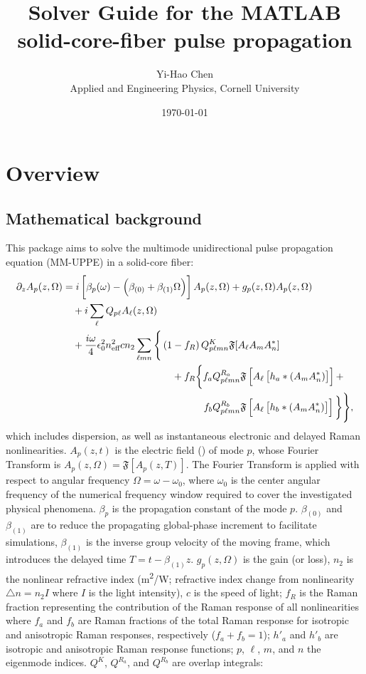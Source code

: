 \documentclass[12pt,hidelinks]{book}
\title{Solver Guide for the MATLAB solid-core-fiber pulse propagation}
\author{Yi-Hao Chen\\Applied and Engineering Physics, Cornell University}
\date{\today}
\begin{document}
\maketitle
\tableofcontents
\newpage

\chapter{Overview}
\section{Mathematical background}
This package aims to solve the multimode unidirectional pulse propagation equation (MM-UPPE) in a solid-core fiber:
\begin{align}
\partial_zA_p(z,\Omega)& =i\left[\beta_p(\omega)-\left(\beta_{(0)}+\beta_{(1)}\Omega\right)\right]A_p(z,\Omega)+g_p(z,\Omega)A_p(z,\Omega) \nonumber \\
& \hspace{1em}+i\sum_{\ell}Q_{p\ell}A_{\ell}(z,\Omega) \nonumber \\
& \hspace{1em}+\frac{i\omega}{4}\epsilon_0^2n_{\text{eff}}^2cn_2\sum_{\ell mn}\Bigg\{\left(1-f_R\right)Q^K_{p\ell mn}\mathfrak{F}[A_{\ell}A_mA_n^{\ast}] \nonumber \\
& \hspace{11em}
+f_R\bigg\{f_aQ^{R_a}_{p\ell mn}\mathfrak{F}\left[A_{\ell}\left[h_a\ast\left(A_mA_n^{\ast}\right)\right]\right]+ \nonumber \\
& \hspace{14.2em} f_bQ^{R_b}_{p\ell mn}\mathfrak{F}\left[A_{\ell}\left[h_b\ast\left(A_mA_n^{\ast}\right)\right]\right]\bigg\}\Bigg\}, \label{eq:solid_core_UPPE}
\end{align}
which includes dispersion, as well as instantaneous electronic and delayed Raman nonlinearities. $A_p(z,t)$ is the electric field (\si{}) of mode $p$, whose Fourier Transform is $A_p(z,\Omega)=\mathfrak{F}[A_p(z,T)]$. The Fourier Transform is applied with respect to angular frequency $\Omega=\omega-\omega_0$, where $\omega_0$ is the center angular frequency of the numerical frequency window required to cover the investigated physical phenomena. $\beta_p$ is the propagation constant of the mode $p$. $\beta_{(0)}$ and $\beta_{(1)}$ are to reduce the propagating global-phase increment to facilitate simulations, $\beta_{(1)}$ is the inverse group velocity of the moving frame, which introduces the delayed time $T=t-\beta_{(1)}z$. $g_p(z,\Omega)$ is the gain (or loss), $n_2$ is the nonlinear refractive index (\si{\m^2/\watt}; refractive index change from nonlinearity $\triangle n=n_2I$ where $I$ is the light intensity), $c$ is the speed of light; $f_R$ is the Raman fraction representing the contribution of the Raman response of all nonlinearities where $f_a$ and $f_b$ are Raman fractions of the total Raman response for isotropic and anisotropic Raman responses, respectively ($f_a+f_b=1$); $h'_a$ and $h'_b$ are isotropic and anisotropic Raman response functions; $p$, $\ell$, $m$, and $n$ the eigenmode indices. $Q^K$, $Q^{R_a}$, and $Q^{R_b}$ are overlap integrals:
\end{document}
